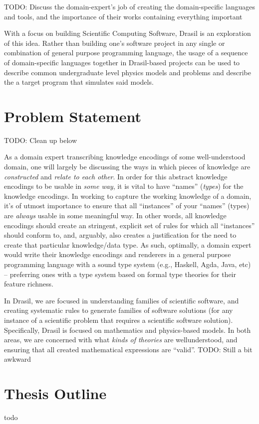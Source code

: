TODO: Discuss the domain-expert's job of creating the domain-specific languages and tools, and the importance of their works containing everything important

With a focus on building Scientific Computing Software, Drasil is an
exploration of this idea. Rather than building one's software project in any
single or combination of general purpose programming language, the usage of a
sequence of domain-specific languages together in Drasil-based projects can be used to describe common
undergraduate level physics models and problems and describe the a target
program that simulates said models.

\section{Problem Statement}

TODO: Clean up below

As a domain expert transcribing knowledge encodings of some
well\hyp{}understood domain, one will largely be discussing the ways in which
pieces of knowledge are \textit{constructed} and \textit{relate to each other}.
In order for this abstract knowledge encodings to be usable in \textit{some way},
it is vital to have ``names'' (\textit{types}) for the knowledge encodings. In
working to capture the working knowledge of a domain, it's of utmost importance
to ensure that all ``instances'' of your ``names'' (types) are \textit{always}
usable in some meaningful way. In other words, all knowledge encodings should
create an stringent, explicit set of rules for which all ``instances'' should
conform to, and, arguably, also creates a justification for the need to create
that particular knowledge/data type. As such, optimally, a domain expert would
write their knowledge encodings and renderers in a general purpose programming
language with a sound type system (e.g., Haskell, Agda, Java, etc) -- preferring
ones with a type system based on formal type theories for their feature richness.

In Drasil, we are focused in understanding families of scientific software, and
creating systematic rules to generate families of software solutions (for any
instance of a scientific problem that requires a scientific software solution).
Specifically, Drasil is focused on mathematics and physics-based models. In both
areas, we are concerned with what \textit{kinds of theories} are
well\-understood, and ensuring that all created mathematical expressions are
``valid''. TODO: Still a bit awkward

\section{Thesis Outline}

todo